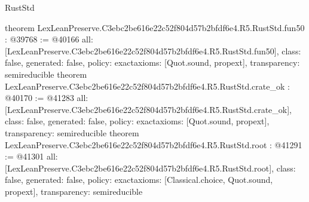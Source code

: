 \begin{lexlean}{RustStd}
\begin{coremodule}
{}
theorem LexLeanPreserve.C3ebc2be616e22c52f804d57b2bfdf6e4.R5.RustStd.fun50 : @39768 := @40166 {
  all: [LexLeanPreserve.C3ebc2be616e22c52f804d57b2bfdf6e4.R5.RustStd.fun50],
  class: false,
  generated: false,
  policy: exact{axioms: [Quot.sound, propext]},
  transparency: semireducible
}
theorem LexLeanPreserve.C3ebc2be616e22c52f804d57b2bfdf6e4.R5.RustStd.crate_ok : @40170 := @41283 {
  all: [LexLeanPreserve.C3ebc2be616e22c52f804d57b2bfdf6e4.R5.RustStd.crate_ok],
  class: false,
  generated: false,
  policy: exact{axioms: [Quot.sound, propext]},
  transparency: semireducible
}
theorem LexLeanPreserve.C3ebc2be616e22c52f804d57b2bfdf6e4.R5.RustStd.root : @41291 := @41301 {
  all: [LexLeanPreserve.C3ebc2be616e22c52f804d57b2bfdf6e4.R5.RustStd.root],
  class: false,
  generated: false,
  policy: exact{axioms: [Classical.choice, Quot.sound, propext]},
  transparency: semireducible
}


\end{coremodule}
\end{lexlean}
